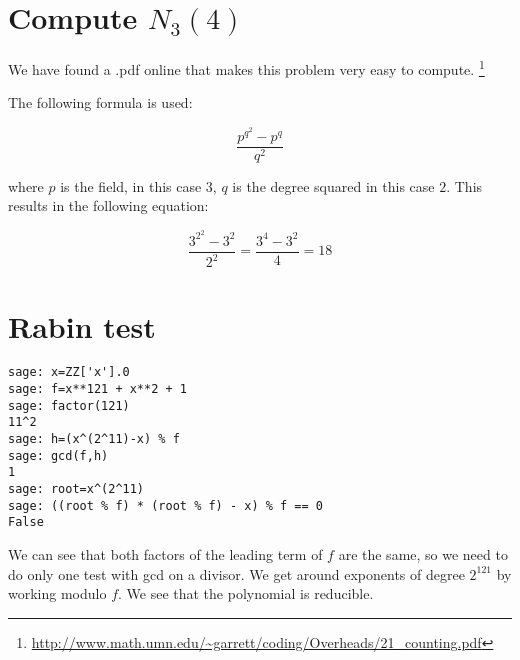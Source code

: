 \documentclass{article}
\begin{document}
\section{Compute $N_3(4)$} 

We have found a .pdf online that makes this problem very easy to compute.
\footnote{\url{http://www.math.umn.edu/~garrett/coding/Overheads/21_counting.pdf}}

The following formula is used:

\[
\frac{p^{q^2} - p^q}{q^2}
\]

where $p$ is the field, in this case $3$, $q$ is the degree squared in this case $2$.
This results in the following equation:

\[
\frac{3^{2^2} - 3^2}{2^2} = \frac{3^4 - 3^2}{4} = 18
\]

\section{Rabin test}
\begin{verbatim}
sage: x=ZZ['x'].0
sage: f=x**121 + x**2 + 1
sage: factor(121)
11^2
sage: h=(x^(2^11)-x) % f
sage: gcd(f,h)
1
sage: root=x^(2^11)
sage: ((root % f) * (root % f) - x) % f == 0
False
\end{verbatim}
We can see that both factors of the leading term of $f$ are the same, so we need to do only one test with gcd on a divisor.
We get around exponents of degree $2^{121}$ by working modulo $f$.
We see that the polynomial is reducible.

\end{document}
